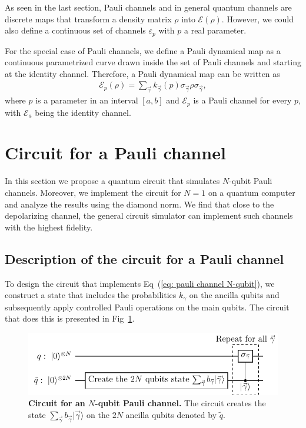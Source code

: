 \documentclass[10pt,letterpaper]{article} %
\newcommand{\fref}[1]{Fig~\ref{#1}}
\newcommand{\eref}[1]{Eq~(\ref{#1})}
\begin{document}
As seen in the last section, Pauli channels and in 
general quantum channels are discrete maps
that transform a density matrix $\rho$ into $\mathcal{E}(\rho)$.
However, we could also define a continuous set of 
channels $\varepsilon_p$ with $p$ a real parameter.

For the special case of Pauli channels, we define 
a Pauli dynamical map as a continuous parametrized 
curve drawn inside the set of Pauli channels and starting at the identity channel. 
Therefore, a Pauli dynamical map can be written as
\begin{eqnarray}
\label{eq: Pauli dynamical map}
\mathcal{E}_p(\rho) = \sum_{\vec{\gamma}} k_{\vec{\gamma}}(p) \sigma_{\vec{\gamma}} \rho \sigma_{\vec{\gamma}},
\end{eqnarray}
where $p$ is a parameter in an interval $[a,b]$ 
and $\mathcal{E}_p$ is a Pauli channel for every $p$, 
with $\mathcal{E}_a$ being the identity channel.

\section{Circuit for a Pauli channel} %
\label{sec: Circuit for a Pauli Channel}

In this section we propose a quantum circuit that simulates $N$-qubit Pauli
channels.   Moreover, we implement the circuit for $N=1$ on a quantum computer
and analyze the results using the diamond norm.
We find that close to the depolarizing channel, the general circuit simulator 
can implement such channels with the highest fidelity. 
\subsection{Description of the circuit for a Pauli channel} %
\label{subsec: Description of the circuit}

To design the circuit that implements \eref{eq: pauli channel N-qubit}, we construct a state that 
includes the probabilities $k_{\gamma}$ on the ancilla qubits and subsequently
apply controlled Pauli operations on the main qubits.  The circuit that does
this is presented in \fref{Fig1}. 


\begin{figure} %
\centering
\includegraphics{circuito_general.pdf}
\caption{{\bf Circuit for an $N$-qubit
Pauli channel.}
The circuit creates the state $\sum_{\vec{\gamma}} b_{\vec{\gamma}}|\vec{\gamma}\rangle$ 
on the $2N$ ancilla qubits denoted by $\tilde{q}$.}
\label{Fig1}
\end{figure} %
\end{document}
